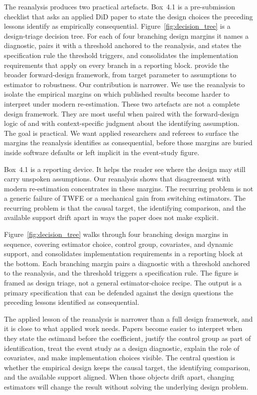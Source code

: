 \documentclass[11pt]{article}
\begin{document}
The reanalysis produces two practical artefacts. Box~4.1 is a pre-submission checklist that asks an applied DiD paper to state the design choices the preceding lessons identify as empirically consequential. Figure~\ref{fig:decision_tree} is a design-triage decision tree. For each of four branching design margins it names a diagnostic, pairs it with a threshold anchored to the reanalysis, and states the specification rule the threshold triggers, and consolidates the implementation requirements that apply on every branch in a reporting block. \textcite{baker2025difference} provide the broader forward-design framework, from target parameter to assumptions to estimator to robustness. Our contribution is narrower. We use the reanalysis to isolate the empirical margins on which published results become harder to interpret under modern re-estimation. These two artefacts are not a complete design framework. They are most useful when paired with the forward-design logic of \textcite{baker2025difference} and with context-specific judgment about the identifying assumption. The goal is practical. We want applied researchers and referees to surface the margins the reanalysis identifies as consequential, before those margins are buried inside software defaults or left implicit in the event-study figure.

Box~4.1 is a reporting device. It helps the reader see where the design may still carry unspoken assumptions. Our reanalysis shows that disagreement with modern re-estimation concentrates in these margins. The recurring problem is not a generic failure of TWFE or a mechanical gain from switching estimators. The recurring problem is that the causal target, the identifying comparison, and the available support drift apart in ways the paper does not make explicit.

Figure~\ref{fig:decision_tree} walks through four branching design margins in sequence, covering estimator choice, control group, covariates, and dynamic support, and consolidates implementation requirements in a reporting block at the bottom. Each branching margin pairs a diagnostic with a threshold anchored to the reanalysis, and the threshold triggers a specification rule. The figure is framed as design triage, not a general estimator-choice recipe. The output is a primary specification that can be defended against the design questions the preceding lessons identified as consequential.

The applied lesson of the reanalysis is narrower than a full design framework, and it is close to what applied work needs. Papers become easier to interpret when they state the estimand before the coefficient, justify the control group as part of identification, treat the event study as a design diagnostic, explain the role of covariates, and make implementation choices visible. The central question is whether the empirical design keeps the causal target, the identifying comparison, and the available support aligned. When those objects drift apart, changing estimators will change the result without solving the underlying design problem.
\end{document}
